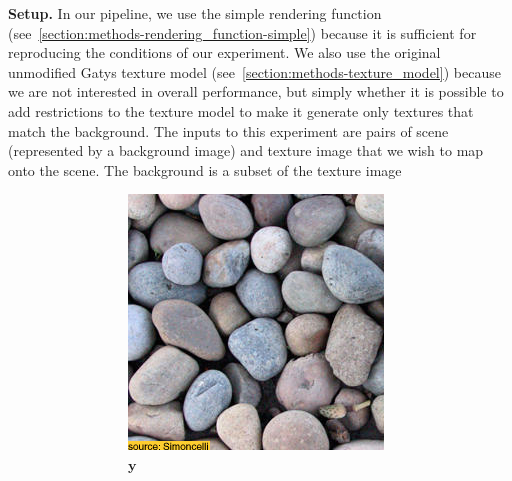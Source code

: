 \textbf{Setup.} In our pipeline, we use the simple rendering function (see~\ref{section:methods-rendering_function-simple}) because it is sufficient for reproducing the conditions of our experiment. We also use the original unmodified Gatys texture model (see~\ref{section:methods-texture_model}) because we are not interested in overall performance, but simply whether it is possible to add restrictions to the texture model to make it generate only textures that match the background. The inputs to this experiment are pairs of scene (represented by a background image) and texture image that we wish to map onto the scene. The background is a subset of the texture image

\begin{figure}[]
    \centering    
    \begin{subfigure}{\textwidth}
        \centering
        \begin{subfigure}{0.24\textwidth}
            \centering
            \includegraphics[width=\textwidth]{images/04-experiment01/pebbles/target.jpg}
            \caption{\(\bm{y}\)}
            \label{fig:ex01-pebbles-1000steps-some_target}
        \end{subfigure}
        \hfill
        \begin{subfigure}{0.24\textwidth}
            \centering

\end{subfigure}
\end{subfigure}
\end{figure}
